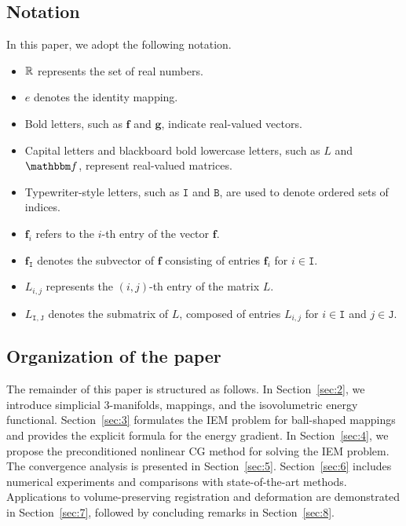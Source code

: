 \documentclass[11pt,a4paper]{article}
\begin{document}
\subsection{Notation}
In this paper, we adopt the following notation.
\begin{itemize}
\item $\mathbb{R}$ represents the set of real numbers.
\item $e$ denotes the identity mapping.
\item Bold letters, such as $\mathbf{f}$ and $\mathbf{g}$, indicate real-valued vectors.
\item Capital letters and blackboard bold lowercase letters, such as $L$ and $\bf$, represent real-valued matrices.
\item Typewriter-style letters, such as $\mathtt{I}$ and $\mathtt{B}$, are used to denote ordered sets of indices.
\item $\mathbf{f}_i$ refers to the $i$-th entry of the vector $\mathbf{f}$.
\item $\mathbf{f}_\mathtt{I}$ denotes the subvector of $\mathbf{f}$ consisting of entries $\mathbf{f}_i$ for $i \in \mathtt{I}$.
\item $L_{i,j}$ represents the $(i,j)$-th entry of the matrix $L$.
\item $L_{\mathtt{I},\mathtt{J}}$ denotes the submatrix of $L$, composed of entries $L_{i,j}$ for $i \in \mathtt{I}$ and $j \in \mathtt{J}$.
\end{itemize}


\subsection{Organization of the paper}

The remainder of this paper is structured as follows. In Section~\ref{sec:2}, we introduce simplicial 3-manifolds, mappings, and the isovolumetric energy functional. Section~\ref{sec:3} formulates the IEM problem for ball-shaped mappings and provides the explicit formula for the energy gradient. In Section~\ref{sec:4}, we propose the preconditioned nonlinear CG method for solving the IEM problem. The convergence analysis is presented in Section~\ref{sec:5}. Section~\ref{sec:6} includes numerical experiments and comparisons with state-of-the-art methods. Applications to volume-preserving registration and deformation are demonstrated in Section~\ref{sec:7}, followed by concluding remarks in Section~\ref{sec:8}.
\end{document}
